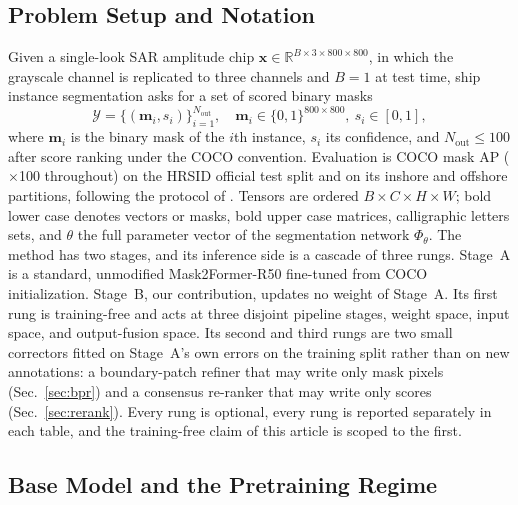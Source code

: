 \subsection{Problem Setup and Notation}\label{sec:setup}

Given a single-look SAR amplitude chip $\mathbf{x}\in\mathbb{R}^{B\times 3\times 800\times 800}$, in which the grayscale channel is replicated to three channels and $B=1$ at test time, ship instance segmentation asks for a set of scored binary masks
\begin{equation}\label{eq:output}
\mathcal{Y}=\bigl\{(\mathbf{m}_i,s_i)\bigr\}_{i=1}^{N_{\mathrm{out}}},\quad
\mathbf{m}_i\in\{0,1\}^{800\times 800},\ s_i\in[0,1],
\end{equation}
where $\mathbf{m}_i$ is the binary mask of the $i$th instance, $s_i$ its confidence, and $N_{\mathrm{out}}\le 100$ after score ranking under the COCO convention. Evaluation is COCO mask AP ($\times$100 throughout) on the HRSID official test split and on its inshore and offshore partitions, following the protocol of \cite{o2former2025}. Tensors are ordered $B\times C\times H\times W$; bold lower case denotes vectors or masks, bold upper case matrices, calligraphic letters sets, and $\theta$ the full parameter vector of the segmentation network $\Phi_{\theta}$. The method has two stages, and its inference side is a cascade of three rungs. Stage~A is a standard, unmodified Mask2Former-R50 \cite{mask2former2022} fine-tuned from COCO initialization. Stage~B, our contribution, updates no weight of Stage~A. Its first rung is training-free and acts at three disjoint pipeline stages, weight space, input space, and output-fusion space. Its second and third rungs are two small correctors fitted on Stage~A's own errors on the training split rather than on new annotations: a boundary-patch refiner that may write only mask pixels (Sec.~\ref{sec:bpr}) and a consensus re-ranker that may write only scores (Sec.~\ref{sec:rerank}). Every rung is optional, every rung is reported separately in each table, and the training-free claim of this article is scoped to the first.

\subsection{Base Model and the Pretraining Regime}\label{sec:base}

